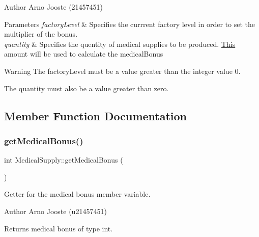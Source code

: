 \begin{DoxyAuthor}{Author}
Arno Jooste (21457451) 
\end{DoxyAuthor}

\begin{DoxyParams}{Parameters}
{\em factory\+Level} & Specifies the currrent factory level in order to set the multiplier of the bonus. \\
\hline
{\em quantity} & Specifies the quentity of medical supplies to be produced. \mbox{\hyperlink{class_this}{This}} amount will be used to calculate the medical\+Bonus \\
\hline
\end{DoxyParams}
\begin{DoxyWarning}{Warning}
The factory\+Level must be a value greater than the integer value 0. 

The quantity must also be a value greater than zero. 
\end{DoxyWarning}


\subsection{Member Function Documentation}
\mbox{\label{class_medical_supply_accd0925a397355951d782a43eb8a0d55}} 
\subsubsection{\texorpdfstring{getMedicalBonus()}{getMedicalBonus()}}
{\footnotesize\ttfamily int Medical\+Supply\+::get\+Medical\+Bonus (\begin{DoxyParamCaption}{ }\end{DoxyParamCaption})}



Getter for the medical bonus member variable. 

\begin{DoxyAuthor}{Author}
Arno Jooste (u21457451) 
\end{DoxyAuthor}
\begin{DoxyReturn}{Returns}
medical bonus of type int. 
\end{DoxyReturn}
\mbox{\label{class_medical_supply_a7dfad8dcb02fa936a063fb1a430c5f42}} 
